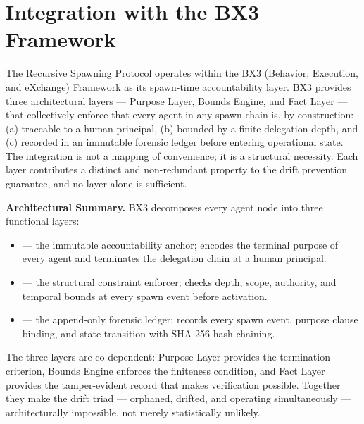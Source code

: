 
\section{Integration with the BX3 Framework}\label{sec:bx3-integration}

The Recursive Spawning Protocol operates within the BX3 (Behavior, Execution, and eXchange) Framework as its spawn-time accountability layer. BX3 provides three architectural layers — Purpose Layer, Bounds Engine, and Fact Layer — that collectively enforce that every agent in any spawn chain is, by construction: (a) traceable to a human principal, (b) bounded by a finite delegation depth, and (c) recorded in an immutable forensic ledger before entering operational state. The integration is not a mapping of convenience; it is a structural necessity. Each layer contributes a distinct and non-redundant property to the drift prevention guarantee, and no layer alone is sufficient.

\bigskip
\noindent\textbf{Architectural Summary.}
BX3 decomposes every agent node into three functional layers:

\begin{itemize}
  \item[\textbf{Purpose Layer}] — the immutable accountability anchor; encodes the terminal purpose of every agent and terminates the delegation chain at a human principal.
  \item[\textbf{Bounds Engine}] — the structural constraint enforcer; checks depth, scope, authority, and temporal bounds at every spawn event before activation.
  \item[\textbf{Fact Layer}] — the append-only forensic ledger; records every spawn event, purpose clause binding, and state transition with SHA-256 hash chaining.
\end{itemize}

The three layers are co-dependent: Purpose Layer provides the termination criterion, Bounds Engine enforces the finiteness condition, and Fact Layer provides the tamper-evident record that makes verification possible. Together they make the drift triad — orphaned, drifted, and operating simultaneously — architecturally impossible, not merely statistically unlikely.

